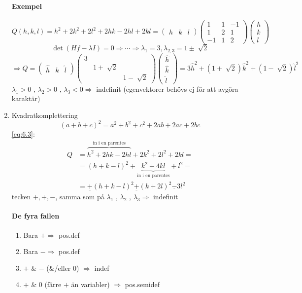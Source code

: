 \documentclass{article}
\let\oldsqrt\sqrt
\renewcommand*{\sqrt}[2][\ ]{\oldsqrt[#1]{#2} }
\begin{document}
\begin{enumerate}
\paragraph{Exempel}
\begin{equation}\label{eq:6.3}
	Q(h,k,l) = h^2 + 2k^2 + 2l^2 + 2hk - 2hl + 2kl = 
	\begin{pmatrix}
		h & k & l
	\end{pmatrix}
	\begin{pmatrix}
		1 & 1 & -1 \\
		1 & 2 & 1 \\
		-1 & 1 & 2
	\end{pmatrix}
	\begin{pmatrix}
		h \\
		k \\
		l
	\end{pmatrix}
\end{equation}
$$
	\det(Hf - \lambda I) = 0 \Rightarrow \cdots \Rightarrow \lambda_1 = 3, \lambda_{2,3} = 1 \pm \sqrt{2}
$$
$$
	\Rightarrow Q = 
	\begin{pmatrix}
		\hat{h} & \hat{k} & \hat{l}
	\end{pmatrix}
	\begin{pmatrix}
		3 & & \\
		& 1+\sqrt{2} & \\
		& & 1-\sqrt{2}
	\end{pmatrix}
	\begin{pmatrix}
		\hat{h} \\
		\hat{k} \\
		\hat{l}
	\end{pmatrix}
	= 3\hat{h}^2 + (1+\sqrt{2})\hat{k}^2 + (1-\sqrt{2})\hat{l}^2
$$
$\lambda_1 > 0$ , $\lambda_2 > 0$ , $\lambda_3 < 0 \Rightarrow$ indefinit (egenvektorer behövs ej för att avgöra karaktär)

\newpage
\item Kvadratkomplettering
$$
	(a+b+c)^2 = a^2 + b^2 + c^2 + 2ab + 2ac + 2bc
$$
\eqref{eq:6.3}:
\begin{align*}
	Q &= \overbrace{h^2 + 2hk - 2hl}^{\text{in i en parentes}} + 2k^2 + 2l^2 + 2kl = \\
	  &= (h+k-l)^2 + \underbrace{k^2 + 4kl}_{\text{in i en parentes}} + l^2 = \\
	  &= \underline{+}(h+k-l)^2 \underline{+} (k+2l)^2 \underline{-} 3l^2
\end{align*}
tecken $+, +, -$, samma som på $\lambda_1$ , $\lambda_2$ , $\lambda_3 \Rightarrow$ indefinit

\paragraph{De fyra fallen}
\begin{enumerate}
\item Bara $+ \Rightarrow$ pos.def
\item Bara $- \Rightarrow$ pos.def
\item $+$ \& $-$ (\&/eller 0) $\Rightarrow$ indef
\item $+$ \& $0$ (färre $+$ än variabler) $\Rightarrow$ pos.semidef
\end{enumerate}
\end{enumerate}
\end{document}
